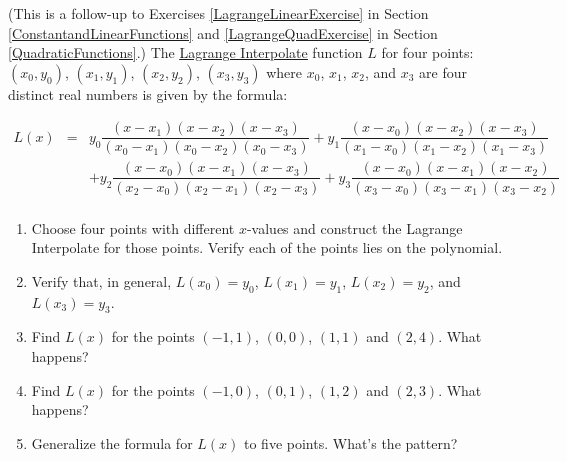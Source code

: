 \documentclass{ximera}
\begin{document}
\begin{problem}\label{LagrangePolyExercise}
(This is a follow-up to Exercises \ref{LagrangeLinearExercise} in Section \ref{ConstantandLinearFunctions} and \ref{LagrangeQuadExercise} in Section \ref{QuadraticFunctions}.) The  \href{https://en.wikipedia.org/wiki/Lagrange_polynomial}{\underline{Lagrange Interpolate}} function $L$  for four  points:  $(x_{0}, y_{0})$, $(x_{1}, y_{1})$,  $(x_{2}, y_{2})$,   $(x_{3}, y_{3})$ where $x_{0}$,  $x_{1}$, $x_{2}$, and $x_{3}$ are four distinct real numbers is given by the formula: 

 \[ \begin{array}{rcl}
 
 L(x) & = &  y_{0}  \dfrac{(x - x_{1}) (x - x_{2}) (x-x_{3})}{(x_{0} - x_{1})(x_{0} - x_{2})(x_{0} - x_{3})}+ y_{1}  \dfrac{(x - x_{0}) (x - x_{2}) (x-x_{3})}{(x_{1} - x_{0})(x_{1} - x_{2})(x_{1} - x_{3})} \\ [15pt]
         &&  +y_{2}  \dfrac{(x - x_{0}) (x - x_{1}) (x-x_{3})}{(x_{2} - x_{0})(x_{2} - x_{1})(x_{2} - x_{3})}+ y_{3}  \dfrac{(x - x_{0}) (x - x_{1}) (x-x_{2})}{(x_{3} - x_{0})(x_{3} - x_{1})(x_{3} - x_{2})} \\ \end{array}\]

\begin{enumerate}

\item Choose four points with different $x$-values and construct the Lagrange Interpolate for those points.  Verify each of the points lies on the polynomial.  

\item  Verify that, in general, $L(x_{0}) = y_{0}$,  $L(x_{1}) = y_{1}$, $L(x_{2}) = y_{2}$, and  $L(x_{3}) = y_{3}$.

\item  Find $L(x)$ for the points $(-1,1)$, $(0,0)$,  $(1,1)$ and $(2,4)$.  What happens?

\item  Find $L(x)$ for the points $(-1,0)$, $(0,1)$,  $(1,2)$ and $(2,3)$.  What happens?

\item  Generalize the formula for $L(x)$ to five points.  What's the pattern?

\end{enumerate}
    
\end{problem}
 
\end{document}
